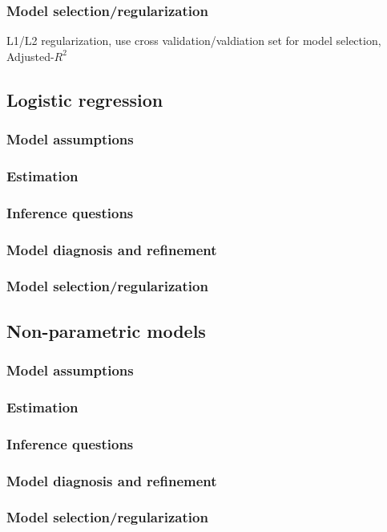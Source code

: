 \documentclass{article}
\begin{document}
\subsubsection{Model selection/regularization}
L1/L2 regularization, use cross validation/valdiation set for model selection, Adjusted-$R^2$

\subsection{Logistic regression}
\subsubsection{Model assumptions}
\subsubsection{Estimation}
\subsubsection{Inference questions}
\subsubsection{Model diagnosis and refinement}
\subsubsection{Model selection/regularization}

\subsection{Non-parametric models}
\subsubsection{Model assumptions}
\subsubsection{Estimation}
\subsubsection{Inference questions}
\subsubsection{Model diagnosis and refinement}
\subsubsection{Model selection/regularization}
\end{document}
